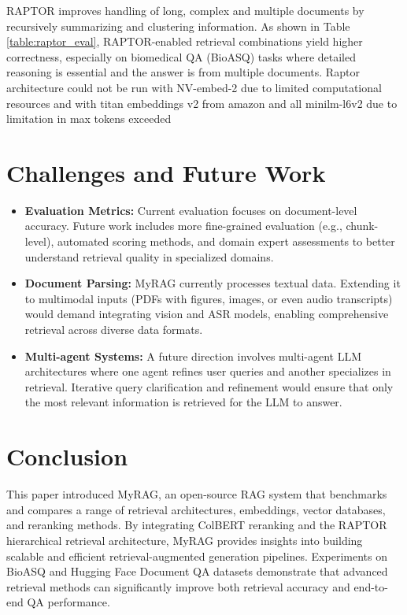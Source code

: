 \documentclass{scrartcl}
\begin{document}
RAPTOR improves handling of long, complex and multiple documents by recursively summarizing and clustering information. As shown in Table \ref{table:raptor_eval}, RAPTOR-enabled retrieval combinations yield higher correctness, especially on biomedical QA (BioASQ) tasks where detailed reasoning is essential and the answer is from multiple documents. Raptor architecture could not be run with NV-embed-2 due to limited computational resources and with titan embeddings v2 from amazon and all minilm-l6v2  due to limitation in max tokens exceeded   

\section{Challenges and Future Work}
\begin{itemize}
    \item \textbf{Evaluation Metrics:} Current evaluation focuses on document-level accuracy. Future work includes more fine-grained evaluation (e.g., chunk-level), automated scoring methods, and domain expert assessments to better understand retrieval quality in specialized domains.
    
    \item \textbf{Document Parsing:} MyRAG currently processes textual data. Extending it to multimodal inputs (PDFs with figures, images, or even audio transcripts) would demand integrating vision and ASR models, enabling comprehensive retrieval across diverse data formats.
    
    \item \textbf{Multi-agent Systems:} A future direction involves multi-agent LLM architectures where one agent refines user queries and another specializes in retrieval. Iterative query clarification and refinement would ensure that only the most relevant information is retrieved for the LLM to answer.
\end{itemize}

\section{Conclusion}

This paper introduced MyRAG, an open-source RAG system that benchmarks and compares a range of retrieval architectures, embeddings, vector databases, and reranking methods. By integrating ColBERT reranking and the RAPTOR hierarchical retrieval architecture, MyRAG provides insights into building scalable and efficient retrieval-augmented generation pipelines. Experiments on BioASQ and Hugging Face Document QA datasets demonstrate that advanced retrieval methods can significantly improve both retrieval accuracy and end-to-end QA performance.
\end{document}

